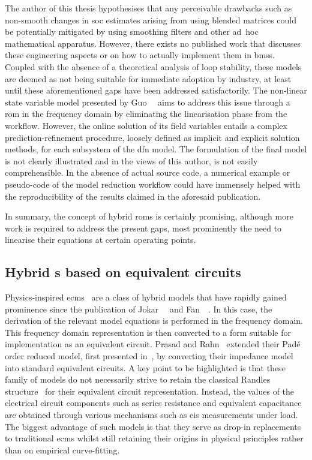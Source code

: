 The author  of this thesis hypothesises  that any perceivable drawbacks  such as
non-smooth changes  in \gls{soc} estimates  arising from using  blended matrices
could  be potentially  mitigated by  using  smoothing filters  and other  \mbox{ad hoc}
mathematical apparatus. However,  there exists no published  work that discusses
these engineering aspects  or on how to actually implement  them in \glspl{bms}.
Coupled with  the absence  of a  theoretical analysis  of loop  stability, these
models are deemed  as not being suitable for immediate  adoption by industry, at
least until  these aforementioned gaps  have been addressed  satisfactorily. The
non-linear state variable model  presented by Guo~\etal{}~\cite{Guo2017} aims to
address this  issue through a \gls{rom}  in the frequency domain  by eliminating
the linearisation phase  from the workflow. However, the online  solution of its
field  variables  entails  a complex  prediction-refinement  procedure,  loosely
defined as  implicit and explicit  solution methods,  for each subsystem  of the
\gls{dfn} model. The  formulation of the final model is  not clearly illustrated
and in the views of this author, is not easily comprehensible. In the absence of
actual source  code, a numerical example  or pseudo-code of the  model reduction
workflow could  have immensely  helped with the  reproducibility of  the results
claimed in the aforesaid publication.

In summary, the  concept of hybrid \glspl{rom} is  certainly promising, although
more work is required to address the  present gaps, most prominently the need to
linearise their equations at certain operating points.


\subsection{Hybrid s based on equivalent circuits}\label{subsec:hybridroms}

Physics-inspired
\glspl{ecm}~\cite{Prasad2012,Prasad2014,Zhang2017,Cheng2017,Merla2018}
are a class of hybrid models that have rapidly gained prominence since the
publication of Jokar~\etal~\cite{Jokar2016} and Fan~\etal~\cite{Fan2015}. In
this case, the derivation of the relevant model equations is performed in
the frequency domain. This frequency domain representation is then converted
to a form suitable for implementation as an equivalent circuit. Prasad
and Rahn~\cite{Prasad2014} extended their Padé order reduced model, first
presented in~\cite{Prasad2013}, by converting their impedance model into
standard equivalent circuits. A key point to be highlighted is that these
family of models do not necessarily strive to retain the classical Randles
structure~\cite{Randles1947} for their equivalent circuit representation.
Instead, the values of the electrical circuit components such as series
resistance and equivalent capacitance are obtained through various mechanisms
such as \gls{eis} measurements under load. The biggest advantage of such
models is that they serve as drop-in replacements to traditional \glspl{ecm}
whilst still retaining their origins in physical principles rather than on
empirical curve-fitting.


